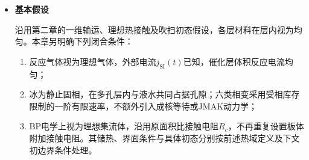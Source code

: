\documentclass[bwprint]{gmcmthesis}
\numberwithin{equation}{section}
\numberwithin{figure}{section}
\begin{document}
\begin{itemize}
 将上述区域记为 \(\Omega_{\text{MEA}}\)。氢气、氧气及水的迁移和电化学反应均在该区域内求解。为考虑双极板的储热和导热作用，将热传递区域进一步扩展为
\begin{equation}
\Omega_T = \Omega_{\text{aBP}} \cup \Omega_{\text{MEA}} \cup \Omega_{\text{cBP}},
\label{eq:src:4-3}
\end{equation}
\begin{equation}
L_{\text{cell}} = 2L_{\text{BP}} + L_{\text{MEA}} = 4.3267 \, \text{mm}.
\label{eq:src:4-4}
\end{equation}

取阳极GDL外侧为$x=0$，阳、阴极双极板分别位于$[-L_{\mathrm{BP}},0]$和$[L_{\mathrm{MEA}},L_{\mathrm{MEA}}+L_{\mathrm{BP}}]$。

 需要强调的是，双极板在本文中仅扩展热计算区域。其内部不设置气体、水和电化学反应源项，反应气体仍由 GDL 外侧的等效流道边界进入 MEA，而不沿厚度方向穿过致密双极板。因此，气体和水的外边界与热传递域的外边界并不重合。

 根据附件给出的双极板厚度、密度与比热容，两侧双极板合计的单位面积热容记为$C_{A,2\mathrm{BP}}$，以区别后续电堆的单板热容，其值为
\begin{equation}
C_{A,2\text{BP}} = 2 \times 0.002 \times 1980 \times 766 = 6066.72 \, \text{J m}^{-2}\text{K}^{-1}.
\label{eq:src:4-7}
\end{equation}


\item \textbf {基本假设}

\renewcommand{\labelenumi}{\arabic{enumi}.}

沿用第二章的一维输运、理想热接触及吹扫初态假设，各层材料在层内视为均匀。本章另明确下列闭合条件：
\begin{enumerate}
    \item 反应气体视为理想气体，外部电流$j_{\mathrm{SI}}(t)$已知，催化层体积反应电流均匀；
    \item 冰为静止固相，在多孔层内与液水共同占据孔隙；六类相变采用受相库存限制的一阶有限速率，不额外引入成核等待或JMAK动力学；
    \item BP电学上视为理想集流体，沿用原面积比接触电阻$R_c$，不再重复设置板体附加接触电阻。其储热、界面条件与具体初态分别按前述热域定义及下文初边界条件处理。
\end{enumerate}



\end{itemize}
\end{document}
